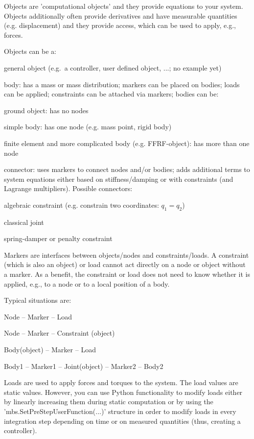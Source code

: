 Objects are 'computational objects' and they provide equations to your system. Objects additionally often provide derivatives and have measurable quantities (e.g. displacement) and they provide access, which can be used to apply, e.g., forces.

Objects can be a:
\bi
  \item general object (e.g.\ a controller, user defined object, ...; no example yet)
	\item body: has a mass or mass distribution; markers can be placed on bodies; loads can be applied; constraints can be attached via markers; bodies can be:
	\bi
	  \item[--] ground object: has no nodes
	  \item[--] simple body: has one node (e.g. mass point, rigid body)
	  \item[--] finite element and more complicated body (e.g. FFRF-object): has more than one node
	\ei
	\item connector: uses markers to connect nodes and/or bodies; adds additional terms to system equations either based on stiffness/damping or with constraints (and Lagrange multipliers). Possible connectors:
	\bi
		\item[--] algebraic constraint (e.g. constrain two coordinates: $q_1 = q_2$)
		\item[--] classical joint
		\item[--] spring-damper or penalty constraint
	\ei
\ei

Markers are interfaces between objects/nodes and constraints/loads.
A constraint (which is also an object) or load cannot act directly on a node or object without a marker.
As a benefit, the constraint or load does not need to know whether it is applied, e.g., to a node or to a local position of a body.

Typical situations are:
\bi
  \item Node -- Marker -- Load
	\item Node -- Marker -- Constraint (object)
	\item Body(object) -- Marker -- Load
	\item Body1 -- Marker1 -- Joint(object) -- Marker2 -- Body2
\ei

Loads are used to apply forces and torques to the system. The load values are static values. However, you can use Python functionality to modify loads either by linearly increasing them during static computation or by using the 'mbs.SetPreStepUserFunction(...)' structure in order to modify loads in every integration step depending on time or on measured quantities (thus, creating a controller).

